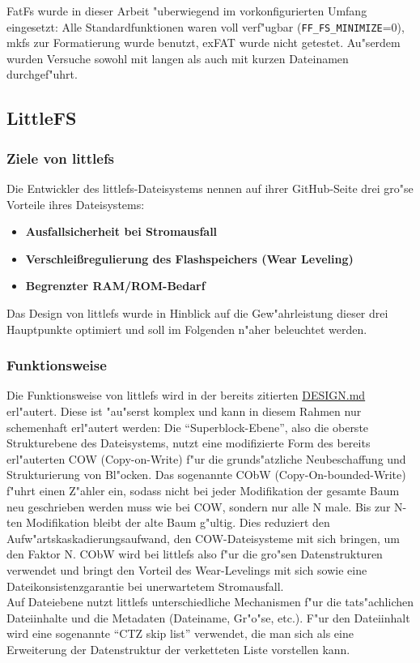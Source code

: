 \documentclass[11pt]{article}
\begin{document}
FatFs wurde in dieser Arbeit "uberwiegend im vorkonfigurierten Umfang eingesetzt: 
Alle Standardfunktionen waren voll verf"ugbar (\texttt{FF\_FS\_MINIMIZE}=0), 
mkfs zur Formatierung wurde benutzt, exFAT wurde nicht
getestet. Au"serdem wurden Versuche sowohl mit langen
als auch mit kurzen Dateinamen durchgef"uhrt.


\subsection{LittleFS}


\subsubsection{Ziele von littlefs}

Die Entwickler des littlefs-Dateisystems nennen auf ihrer GitHub-Seite drei gro"se Vorteile ihres Dateisystems:
\begin{itemize}
    \item \textbf{Ausfallsicherheit bei Stromausfall} 
    \item \textbf{Verschleißregulierung des Flashspeichers (Wear Leveling)} 
    \item \textbf{Begrenzter RAM/ROM-Bedarf}
\end{itemize}

Das Design von littlefs wurde in Hinblick auf die Gew"ahrleistung dieser drei Hauptpunkte optimiert
und soll im Folgenden n"aher beleuchtet werden.


\subsubsection{Funktionsweise} \label{sec:funclittle}
Die Funktionsweise von littlefs wird in der bereits zitierten \href{https://github.com/littlefs-project/littlefs/blob/master/DESIGN.md}{DESIGN.md}
erl"autert. Diese ist "au"serst komplex und kann in diesem Rahmen nur schemenhaft erl"autert werden:
Die \enquote{Superblock-Ebene}, also die oberste Strukturebene des Dateisystems, nutzt eine modifizierte Form
des bereits erl"auterten COW (Copy-on-Write) f"ur die grunds"atzliche Neubeschaffung und Strukturierung von Bl"ocken. 
Das sogenannte CObW (Copy-On-bounded-Write) f"uhrt einen Z"ahler ein, sodass nicht bei jeder Modifikation
der gesamte Baum neu geschrieben werden muss wie bei COW, sondern nur alle N male. Bis zur N-ten Modifikation
bleibt der alte Baum g"ultig. Dies reduziert den Aufw"artskaskadierungsaufwand, den COW-Dateisysteme mit sich bringen,
um den Faktor N. CObW wird bei littlefs also f"ur die gro"sen Datenstrukturen verwendet und bringt 
den Vorteil des Wear-Levelings mit sich sowie eine Dateikonsistenzgarantie bei unerwartetem Stromausfall. \\
Auf Dateiebene nutzt littlefs unterschiedliche Mechanismen
f"ur die tats"achlichen Dateiinhalte und die Metadaten (Dateiname, Gr"o"se, etc.).
F"ur den Dateiinhalt wird eine sogenannte \enquote{CTZ skip list} verwendet, 
die man sich als eine Erweiterung der Datenstruktur der verketteten Liste vorstellen kann.
\end{document}
